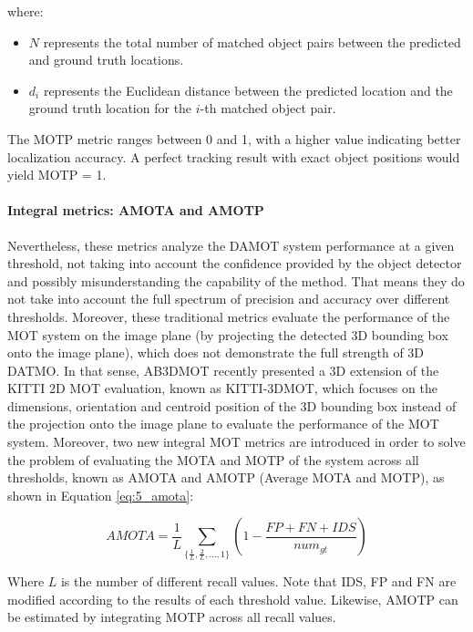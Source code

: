 where:
\begin{itemize}
	\item \(N\) represents the total number of matched object pairs between the predicted and ground truth locations.
	\item \(d_i\) represents the Euclidean distance between the predicted location and the ground truth location for the \(i\)-th matched object pair.
\end{itemize}

The MOTP metric ranges between 0 and 1, with a higher value indicating better localization accuracy. A perfect tracking result with exact object positions would yield MOTP = 1.

\paragraph{Integral metrics: AMOTA and AMOTP}
\label{par:4_integral_metrics}

Nevertheless, these metrics analyze the DAMOT system performance at a given threshold, not taking into account the confidence provided by the object detector and possibly misunderstanding the capability of the method. That means they do not take into account the full spectrum of precision and accuracy over different thresholds. Moreover, these traditional metrics evaluate the performance of the MOT system on the image plane (by projecting the detected 3D bounding box onto the image plane), which does not demonstrate the full strength of 3D DATMO. In that sense, AB3DMOT \cite{weng20203d} recently presented a 3D extension of the KITTI 2D MOT evaluation, known as KITTI-3DMOT, which focuses on the dimensions, orientation and centroid position of the 3D bounding box instead of the projection onto the image plane to evaluate the performance of the MOT system. Moreover, two new integral MOT metrics are introduced in order to solve the problem of evaluating the MOTA and MOTP of the system across all thresholds, known as AMOTA and AMOTP (Average MOTA and MOTP), as shown in Equation \ref{eq:5_amota}:

\begin{equation}
	\label{eq:5_amota}
	AMOTA = \frac{1}{L}\sum_{\{\frac{1}{L},\frac{2}{L},...,1\}}(1-\frac{FP+FN+IDS}{num_{gt}})
\end{equation}

Where $L$ is the number of different recall values. Note that IDS, FP and FN are modified according to the results of each threshold value. Likewise, AMOTP can be estimated by integrating MOTP across all recall values.


